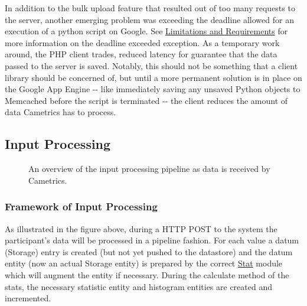 \documentclass[10pt,a4paper,english]{article}
\begin{document}
In addition to the bulk upload feature that resulted out of too many requests to the server, another emerging problem was exceeding the deadline allowed for an execution of a python script on Google. See \href{\#limitations-and-requirements}{Limitations and Requirements} for more information on the deadline exceeded exception. As a temporary work around, the PHP client trades, reduced latency for guarantee that the data passed to the server is saved. Notably, this should not be something that a client library should be concerned of, but until a more permanent solution is in place on the Google App Engine -{}- like immediately saving any unsaved Python objects to Memcached before the script is terminated -{}- the client reduces the amount of data Cametrics has to process.



\hypertarget{input-processing}{}
\subsection*{Input Processing}
\label{input-processing}
\begin{figure}[htbp]
\centering

\caption{An overview of the input processing pipeline as data is received by Cametrics.}\end{figure}



\hypertarget{framework-of-input-processing}{}
\subsubsection*{Framework of Input Processing}
\label{framework-of-input-processing}

As illustrated in the figure above, during a HTTP POST to the system the participant's data will be processed in a pipeline fashion. For each value a datum (Storage) entry is created (but not yet pushed to the datastore) and the datum entity (now an actual Storage entity) is prepared by the correct \href{\#stat}{Stat} module which will augment the entity if necessary. During the calculate method of the stats, the necessary statistic entity and histogram entities are created and incremented.
\end{document}
